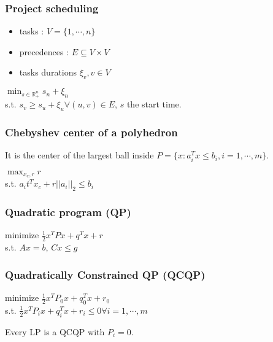 \documentclass[../main.tex]{subfiles}
\begin{document}
\subsubsection{Project scheduling}
\begin{itemize}
    \item tasks : $V = \{1,\cdots, n\}$
    \item precedences : $E\subseteq V \times V$
    \item tasks durations $\xi_v, v \in V$
\end{itemize}
\begin{center}
    $\min_{s \in \mathbb{R}_+^n} s_n + \xi_n$\\
    s.t. $s_v \geq s_u + \xi_u \forall (u,v) \in E$, $s$ the start time.
\end{center}

\subsubsection{Chebyshev center of a polyhedron}
It is the center of the largest ball inside $P = \{x: a_i^T x \leq b_i, i=1,\cdots, m\}$.\\

\begin{center}
    $\max_{x_c,r} r$\\
    s.t. $a_it^T x_c + r \lvert \lvert a_i\rvert \rvert_2 \leq b_i$
\end{center}

\subsubsection{Quadratic program (QP)}
\begin{center}
    minimize $\frac{1}{2} x^T Px + q^Tx + r$\\
    s.t. $Ax = b$, $Cx \leq g$
\end{center}

\subsubsection{Quadratically Constrained QP (QCQP) }
\begin{center}
    minimize $\frac{1}{2} x^T P_0 x + q^T_0 x + r_0$\\
    s.t. $\frac{1}{2} x^T P_i x + q_i^Tx + r_i \leq 0 \forall i=1,\cdots, m$
\end{center}
Every LP is a QCQP with $P_i = 0$.\\
\end{document}
